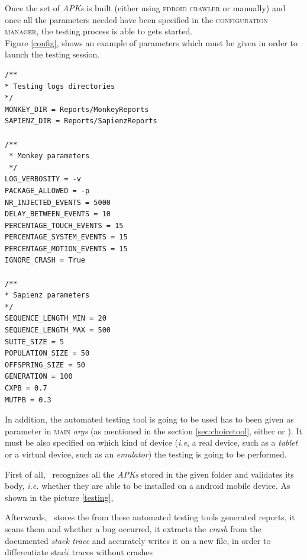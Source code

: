 Once the set of \textit{APKs} is built (either using \textsc{fdroid crawler}
or manually) and once all the parameters needed have been specified in the \textsc{configuration manager}, the testing process is able to gets started. \\
Figure \ref{config}, shows an example of parameters which must be given in order to launch the testing session. 

\label{config}
\begin{lstlisting}[caption=A set of needed parameters in order to start the testing process]
/**
* Testing logs directories
*/
MONKEY_DIR = Reports/MonkeyReports
SAPIENZ_DIR = Reports/SapienzReports

/**
 * Monkey parameters
 */
LOG_VERBOSITY = -v 
PACKAGE_ALLOWED = -p
NR_INJECTED_EVENTS = 5000
DELAY_BETWEEN_EVENTS = 10
PERCENTAGE_TOUCH_EVENTS = 15
PERCENTAGE_SYSTEM_EVENTS = 15
PERCENTAGE_MOTION_EVENTS = 15
IGNORE_CRASH = True

/**
* Sapienz parameters
*/
SEQUENCE_LENGTH_MIN = 20
SEQUENCE_LENGTH_MAX = 500
SUITE_SIZE = 5
POPULATION_SIZE = 50
OFFSPRING_SIZE = 50
GENERATION = 100
CXPB = 0.7
MUTPB = 0.3
\end{lstlisting}

In addition, the automated testing tool is going to be used has to been given as parameter in \textsc{main} \textit{args} (as mentioned in the section \ref{sec:choicetool}, either \monkey or \sapienz). 
It must be also specified on which kind of device (\textit{i.e}, a real device, such as a \textit{tablet} or a virtual device, such as an \textit{emulator}) the testing is going to be performed. 





First of all, \toolname\ recognizes all the \textit{APKs} stored in the given folder and validates its body, \textit{i.e.} whether they are able to be installed on a android mobile device.
As shown in the picture \ref{testing},  








Afterwards, \toolname\ stores the from these automated testing tools generated reports, it scans them and whether a bug occurred, it extracts the \textit{crash} from the documented \textit{stack trace} and accurately writes it on a new file, in order to differentiate stack traces without crashes

